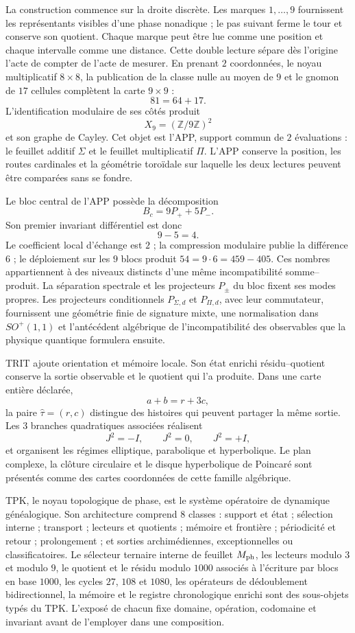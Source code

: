 La construction commence sur la droite discrète. Les marques
\(1,\ldots,9\) fournissent les représentants visibles d'une phase
nonadique ; le pas suivant ferme le tour et conserve son quotient. Chaque
marque peut être lue comme une position et chaque intervalle comme une distance. Cette double
lecture sépare dès l'origine l'acte de compter de l'acte de mesurer. En prenant
\(2\) coordonnées, le noyau multiplicatif \(8\times8\), la publication de la
classe nulle au moyen de \(9\) et le gnomon de \(17\) cellules complètent la carte
\(9\times9\) :
\[
 81=64+17.
\]
L'identification modulaire de ses côtés produit
\[
 X_9=(\mathbb Z/9\mathbb Z)^2
\]
et son graphe de Cayley. Cet objet est l'APP, support commun de \(2\) évaluations :
le feuillet additif \(\Sigma\) et le feuillet multiplicatif \(\Pi\). L'APP conserve la
position, les routes cardinales et la géométrie toroïdale sur laquelle les deux
lectures peuvent être comparées sans se fondre.

Le bloc central de l'APP possède la décomposition
\[
 B_c=9P_++5P_-.
\]
Son premier invariant différentiel est donc
\[
 \boxed{9-5=4}.
\]
Le coefficient local d'échange est \(2\) ; la compression modulaire publie
la différence \(6\) ; le déploiement sur les \(9\) blocs produit
\(54=9\cdot6=459-405\). Ces nombres appartiennent à des niveaux distincts d'une
même incompatibilité somme--produit. La séparation spectrale et les
projecteurs \(P_\pm\) du bloc fixent ses modes propres. Les projecteurs
conditionnels \(P_{\Sigma,d}\) et \(P_{\Pi,d}\), avec leur commutateur,
fournissent une géométrie finie de signature mixte,
une normalisation dans \(SO^+(1,1)\) et l'antécédent algébrique de
l'incompatibilité des observables que la physique quantique formulera ensuite.

TRIT ajoute orientation et mémoire locale. Son état enrichi
résidu--quotient conserve la sortie observable et le quotient qui l'a produite.
Dans une carte entière déclarée,
\[
 a+b=r+3c,
\]
la paire \(\widehat\tau=(r,c)\) distingue des histoires qui peuvent partager la
même sortie. Les \(3\) branches quadratiques associées réalisent
\[
 J^2=-I,\qquad J^2=0,\qquad J^2=+I,
\]
et organisent les régimes elliptique, parabolique et hyperbolique. Le plan
complexe, la clôture circulaire et le disque hyperbolique de Poincaré sont présentés
comme des cartes coordonnées de cette famille algébrique.

TPK, le noyau topologique de phase, est le système opératoire de dynamique
généalogique. Son architecture comprend \(8\) classes : support et état ; sélection interne ;
transport ; lecteurs et quotients ; mémoire et frontière ; périodicité et retour ;
prolongement ; et sorties archimédiennes, exceptionnelles ou classificatoires.
Le sélecteur ternaire interne de feuillet \(M_{\rm ph}\), les
lecteurs modulo \(3\) et modulo \(9\), le quotient et le résidu modulo
\(1000\) associés à l'écriture par blocs en base \(1000\), les cycles
\(27\), \(108\) et \(1080\), les opérateurs de dédoublement bidirectionnel,
la mémoire et le registre chronologique enrichi sont des sous-objets typés du
TPK. L'exposé de chacun fixe domaine, opération, codomaine et
invariant avant de l'employer dans une composition.

